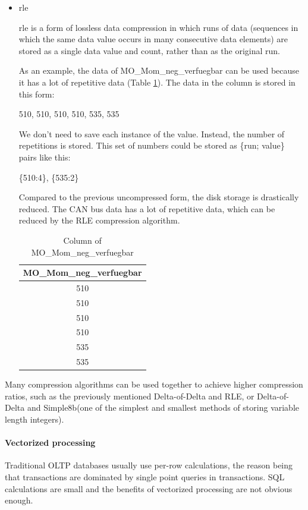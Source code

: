 \begin{itemize}
    \item \ac{rle}
    
    \ac{rle} is a form of lossless data compression in which runs of data (sequences in which the same data value occurs in many consecutive data elements) are stored as a single data value and count, rather than as the original run\cite{wikipedia_rle}.
    
    As an example, the data of MO\_Mom\_neg\_verfuegbar can be used because it has a lot of repetitive data (Table \ref{tab:mom_rle}). The data in the column is stored in this form:
    
    510, 510, 510, 510, 535, 535
    
    We don't need to save each instance of the value. Instead, the number of repetitions is stored. This set of numbers could be stored as \{run; value\} pairs \cite{lockerman_2022} like this:
    
    \{510:4\}, \{535:2\}
    
    Compared to the previous uncompressed form, the disk storage is drastically reduced. The CAN bus data has a lot of repetitive data, which can be reduced by the RLE compression algorithm.
    
\begin{table}[hbt!]
\centering
\begin{tabular}{|c|}
\hline
MO\_Mom\_neg\_verfuegbar \\ \hline
510                      \\ \hline
510                      \\ \hline
510                      \\ \hline
510                      \\ \hline
535                      \\ \hline
535                      \\ \hline
\end{tabular}
\caption{Column of MO\_Mom\_neg\_verfuegbar}
\label{tab:mom_rle}
\end{table}
    
    
\end{itemize}
Many compression algorithms can be used together to achieve higher compression ratios, such as the previously mentioned Delta-of-Delta and RLE, or Delta-of-Delta and Simple8b(one of the simplest and smallest methods of storing variable length integers).


\paragraph{Vectorized processing}
Traditional OLTP databases usually use per-row calculations, the reason being that transactions are dominated by single point queries in transactions. SQL calculations are small and the benefits of vectorized processing are not obvious enough. 

